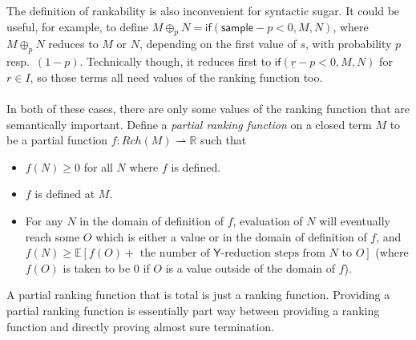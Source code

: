 \documentclass{article}
\newcommand{\tY}{\mathsf{Y}}
\newcommand{\tif}[3]{\mathsf{if}(#1, #2, #3)} %
\newcommand{\tsample}{\mathsf{sample}}
\theoremstyle{definition}
\theoremstyle{lemma}
\theoremstyle{remark}
\begin{document}
The definition of rankability is also inconvenient for syntactic sugar. It could be useful, for example, to define $M \oplus_p N = \tif{\tsample - p < 0} M N$, where $M \oplus_p N$ reduces to $M$ or $N$, depending on the first value of $s$, with probability $p$ resp.~$(1-p)$. Technically though, it reduces first to $\tif{\underline r - p < 0} M N$ for $r \in I$, so those terms all need values of the ranking function too.

\paragraph{}
In both of these cases, there are only some values of the ranking function that are semantically important. Define a \emph{partial ranking function} on a closed term $M$ to be a partial function $f : Rch(M) \rightharpoonup \mathbb R$ such that
\begin{itemize}
    \item $f(N) \geq 0$ for all $N$ where $f$ is defined.
    \item $f$ is defined at $M$.
    \item For any $N$ in the domain of definition of $f$, evaluation of $N$ will eventually  reach some $O$ which is either a value or in the domain of definition of $f$, and $f(N) \geq \mathbb E[f(O) + \text{ the number of $\tY$-reduction steps from $N$ to $O$}]$ (where $f(O)$ is taken to be 0 if $O$ is a value outside of the domain of $f$).
\end{itemize}
A partial ranking function that is total is just a ranking function. Providing a partial ranking function is essentially part way between providing a ranking function and directly proving almost sure termination.
\end{document}
